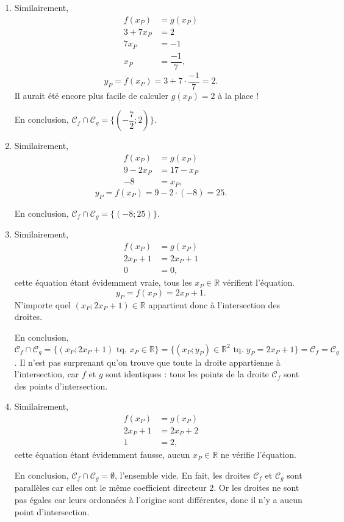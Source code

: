 \documentclass[12pt]{paper}
\theoremstyle{plain}
\theoremstyle{definition}
\newcommand{\C}{\mathcal{C}}
\newcommand{\R}{\mathbb{R}}
\begin{document}
{\begin{enumerate}
		\item 
			Similairement,
			\begin{align*}
				f(x_P) &= g(x_P) \\
				3 + 7x_P & = 2 \\
				7x_P &= -1 \\
				x_P &= \dfrac{-1}7,
			\end{align*}
			\[
				y_P = f(x_P) = 3+7\cdot \dfrac{-1}7  = 2.
			\]
			Il aurait été encore plus facile de calculer $g(x_P) = 2$ à la place !
			
			En conclusion, $\C_f \cap \C_g = \{ \left(-\dfrac72 ; 2\right) \}$.
		
		\item
			Similairement,
			\begin{align*}
				f(x_P) &= g(x_P) \\
				9-2x_P & = 17-x_P \\
				-8 &= x_P,
			\end{align*}
			\[
				y_P = f(x_P) = 9-2 \cdot(-8) = 25.
			\]
		
			En conclusion, $\C_f \cap \C_g = \{ (-8;25) \}$.
		
		\item 			
		Similairement,
			\begin{align*}
				f(x_P) &= g(x_P) \\
				2x_P + 1 & = 2x_P + 1 \\
				0 &= 0,
			\end{align*}
			cette équation étant évidemment vraie, tous les $x_P \in \R$ vérifient l'équation.
			\[
				y_P = f(x_P) = 2x_P + 1.
			\]
			N'importe quel $(x_P ; 2x_P+1) \in \R$ appartient donc à l'intersection des droites.
			
			En conclusion, $\C_f \cap \C_g = \{ (x_P ; 2x_P+1) \text{ tq. } x_P \in \R \} = \{ (x_P ; y_P) \in \R^2 \text{ tq. } y_P = 2x_P + 1 \} = \C_f = \C_g$.
			Il n'est pas surprenant qu'on trouve que toute la droite appartienne à l'intersection, car $f$ et $g$ sont identiques : tous les points de la droite $\C_f$ sont des points d'intersection.
		
		
		\item 
			Similairement,
			\begin{align*}
				f(x_P) &= g(x_P) \\
				2x_P + 1 & = 2x_P + 2 \\
				1 &= 2,
			\end{align*}
			cette équation étant évidemment fausse, aucun $x_P \in \R$ ne vérifie l'équation.
			
			En conclusion, $\C_f \cap \C_g = \emptyset$, l'ensemble vide.
			En fait, les droites $\C_f$ et $\C_g$ sont parallèles car elles ont le même coefficient directeur $2$.
			Or les droites ne sont pas égales car leurs ordonnées à l'origine sont différentes, donc il n'y a aucun point d'intersection.
	\end{enumerate}

}
\end{document}
